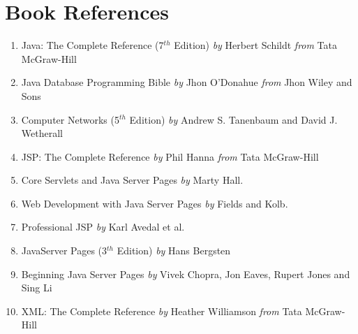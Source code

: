 \chapter{Book References}
\begin{enumerate}
\item Java: The Complete Reference (7$ ^{th} $ Edition) \emph{by} Herbert Schildt \emph{from} Tata McGraw-Hill
\item Java Database Programming Bible \emph{by} Jhon O'Donahue \emph{from} Jhon Wiley and Sons
\item Computer Networks (5$ ^{th}$ Edition) \emph{by} Andrew S. Tanenbaum and David J. Wetherall
\item JSP: The Complete Reference \emph{by} Phil Hanna \emph{from} Tata McGraw-Hill
\item Core Servlets and Java Server Pages  \emph{by} Marty Hall.
\item Web Development with Java Server Pages  \emph{by} Fields and Kolb.
\item Professional JSP \emph{by} Karl Avedal et al.
\item JavaServer Pages  (3$ ^{th}$ Edition)  \emph{by} Hans Bergsten 
\item Beginning Java Server Pages \emph{by} Vivek Chopra, Jon Eaves, Rupert Jones and Sing Li 
\item XML: The Complete Reference \emph{by} Heather Williamson \emph{from} Tata McGraw-Hill
\end{enumerate}


